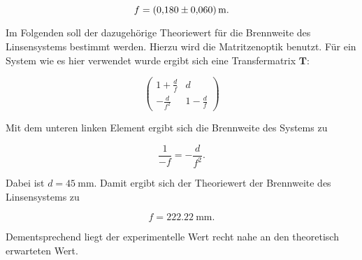 \begin{equation*}
f = \SI{0.180+-0.060}{\meter}.
\end{equation*}

Im Folgenden soll der dazugehörige Theoriewert für die Brennweite des Linsensystems bestimmt werden. Hierzu
wird die Matritzenoptik benutzt. Für ein System wie es hier verwendet wurde ergibt sich eine 
Transfermatrix $\symbf{T}$:

\begin{equation*}
\begin{pmatrix}
 1+\frac{d}{f} & d \\
 -\frac{d}{f^2} & 1-\frac{d}{f}
\end{pmatrix}
\end{equation*}

Mit dem unteren linken Element ergibt sich die Brennweite des Systems zu

\begin{equation*}
\frac{1}{-f} = -\frac{d}{f^2}.
\end{equation*}

Dabei ist $d=\SI{45}{\milli\meter}$. Damit ergibt sich der Theoriewert der Brennweite des Linsensystems zu

\begin{equation*}
f = \SI{222,22}{\milli\meter}.
\end{equation*}

Dementsprechend liegt der experimentelle Wert recht nahe an den theoretisch erwarteten Wert. 